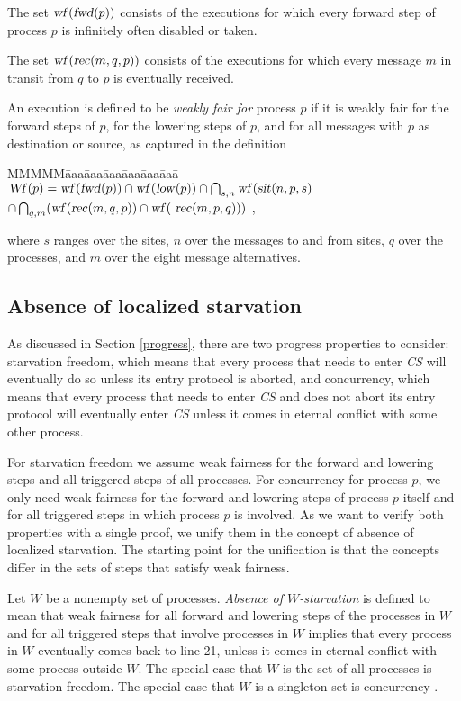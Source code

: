 \documentclass[10pt]{article} \usepackage[english]{babel}
\newenvironment{tab}{\begin{tabbing}
MMMMM\=aaa\=aaa\=aaa\=aaa\=aaa\=aaa\= \kill}{\end{tabbing}}
\def\S #1/{\mbox {\textsl{#1}}}
\begin{document}
The set $\S wf/(\S fwd/(p))$ consists of the executions for which
every forward step of process $p$ is infinitely often disabled or
taken.

The set $\S wf/(\S rec/(m,q,p))$ consists of the executions for which
every message $m$ in transit from $q$ to $p$ is eventually received.

An execution is defined to be \emph{weakly fair for} process $p$ if it
is weakly fair for the forward steps of $p$, for the lowering steps of
$p$, and for all messages with $p$ as destination or source, as
captured in the definition
\begin{tab}
  \> $ \S Wf/(p) = \S wf/(\S fwd/(p))\cap \S wf/(\S low/(p))\cap 
  \bigcap_{s,n} \S wf/ (\S sit/(n,p,s) $\\
  \>\>\> $ \cap \bigcap_{q, m}(\S wf/(\S rec/(m,q,p))\cap \S wf/(\S
  rec/(m,p,q))) $ ,
\end{tab}
where $s$ ranges over the sites, $n$ over the messages to and from
sites, $q$ over the processes, and $m$ over the eight message
alternatives.

\subsection{Absence of localized starvation} \label{s.liveness}

As discussed in Section \ref{progress}, there are two progress
properties to consider: starvation freedom, which means that every
process that needs to enter \S CS/ will eventually do so unless its
entry protocol is aborted, and concurrency, which means that every
process that needs to enter \S CS/ and does not abort its entry
protocol will eventually enter \S CS/ unless it comes in eternal
conflict with some other process.

For starvation freedom we assume weak fairness for the forward and
lowering steps and all triggered steps of all processes.  For
concurrency for process $p$, we only need weak fairness for the
forward and lowering steps of process $p$ itself and for all triggered
steps in which process $p$ is involved.  As we want to verify both
properties with a single proof, we unify them in the concept of
{absence of localized starvation}.  The starting point for the
unification is that the concepts differ in the sets of steps that
satisfy weak fairness.

Let $W$ be a nonempty set of processes.  \emph{Absence of
  $W$-starvation} is defined to mean that weak fairness for all
forward and lowering steps of the processes in $W$ and for all
triggered steps that involve processes in $W$ implies that every
process in $W$ eventually comes back to line 21, unless it comes in
eternal conflict with some process outside $W$.  The special case that
$W$ is the set of all processes is starvation freedom.  The special
case that $W$ is a singleton set is concurrency \cite{ChM84,Rhe98}.
\end{document}
